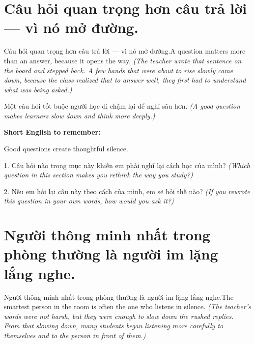 \section{Câu hỏi quan trọng hơn câu trả lời — vì nó mở đường.}
\begin{truyen}{Câu hỏi quan trọng hơn câu trả lời — vì nó mở đường.}{A question matters more than an answer, because it opens the way.}
\textit{(The teacher wrote that sentence on the board and stepped back. A few hands that were about to rise slowly came down, because the class realized that to answer well, they first had to understand what was being asked.)}
\end{truyen}

\begin{baihoc}
Một câu hỏi tốt buộc người học đi chậm lại để nghĩ sâu hơn.
\textit{(A good question makes learners slow down and think more deeply.)}
\end{baihoc}

\begin{ghinhoanh}
\textbf{Short English to remember:}

Good questions create thoughtful silence.

\end{ghinhoanh}

\begin{tuhocnhanh}
1. Câu hỏi nào trong mục này khiến em phải nghĩ lại cách học của mình? \textit{(Which question in this section makes you rethink the way you study?)}

2. Nếu em hỏi lại câu này theo cách của mình, em sẽ hỏi thế nào? \textit{(If you rewrote this question in your own words, how would you ask it?)}
\end{tuhocnhanh}
\ngancach


\section{Người thông minh nhất trong phòng thường là người im lặng lắng nghe.}
\begin{truyen}{Người thông minh nhất trong phòng thường là người im lặng lắng nghe.}{The smartest person in the room is often the one who listens in silence.}
\textit{(The teacher's words were not harsh, but they were enough to slow down the rushed replies. From that slowing down, many students began listening more carefully to themselves and to the person in front of them.)}
\end{truyen}

